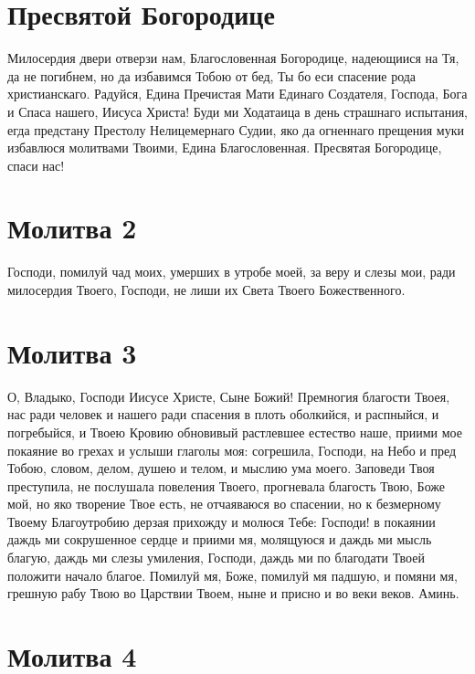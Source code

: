 \section{Пресвятой Богородице}
 

Милосердия двери отверзи нам, Благословенная Богородице, надеющиися на Тя, да не погибнем, но да избавимся Тобою от бед, Ты бо еси спасение рода христианскаго. Радуйся, Едина Пречистая Мати Единаго Создателя, Господа, Бога и Спаса нашего, Иисуса Христа! Буди ми Ходатаица в день страшнаго испытания, егда предстану Престолу Нелицемернаго Судии, яко да огненнаго прещения муки избавлюся молитвами Твоими, Едина Благословенная. Пресвятая Богородице, спаси нас!


\section{Молитва 2}
 


Господи, помилуй чад моих, умерших в утробе моей, за веру и слезы мои, ради милосердия Твоего, Господи, не лиши их Света Твоего Божественного.

\section{Молитва 3}
 


О, Владыко, Господи Иисусе Христе, Сыне Божий! Премногия благости Твоея, нас ради человек и нашего ради спасения в плоть оболкийся, и распныйся, и погребыйся, и Твоею Кровию обновивый растлевшее естество наше, приими мое покаяние во грехах и услыши глаголы моя: согрешила, Господи, на Небо и пред Тобою, словом, делом, душею и телом, и мыслию ума моего. Заповеди Твоя преступила, не послушала повеления Твоего, прогневала благость Твою, Боже мой, но яко творение Твое есть, не отчаяваюся во спасении, но к безмерному Твоему Благоутробию дерзая прихожду и молюся Тебе: Господи! в покаянии даждь ми сокрушенное сердце и приими мя, молящуюся и даждь ми мысль благую, даждь ми слезы умиления, Господи, даждь ми по благодати Твоей положити начало благое. Помилуй мя, Боже, помилуй мя падшую, и помяни мя, грешную рабу Твою во Царствии Твоем, ныне и присно и во веки веков. Аминь.

\section{Молитва 4}
 


